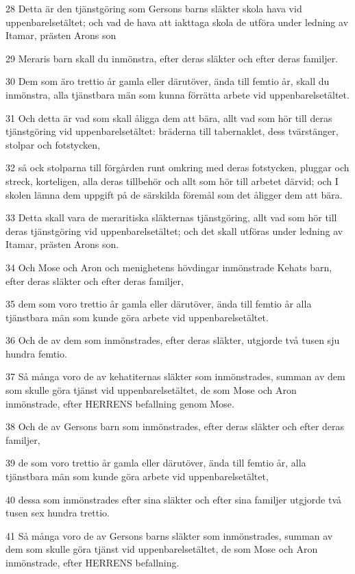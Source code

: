 \par 28 Detta är den tjänstgöring som Gersons barns släkter skola hava vid uppenbarelsetältet; och vad de hava att iakttaga skola de utföra under ledning av Itamar, prästen Arons son
\par 29 Meraris barn skall du inmönstra, efter deras släkter och efter deras familjer.
\par 30 Dem som äro trettio år gamla eller därutöver, ända till femtio år, skall du inmönstra, alla tjänstbara män som kunna förrätta arbete vid uppenbarelsetältet.
\par 31 Och detta är vad som skall åligga dem att bära, allt vad som hör till deras tjänstgöring vid uppenbarelsetältet: bräderna till tabernaklet, dess tvärstänger, stolpar och fotstycken,
\par 32 så ock stolparna till förgården runt omkring med deras fotstycken, pluggar och streck, korteligen, alla deras tillbehör och allt som hör till arbetet därvid; och I skolen lämna dem uppgift på de särskilda föremål som det åligger dem att bära.
\par 33 Detta skall vara de meraritiska släkternas tjänstgöring, allt vad som hör till deras tjänstgöring vid uppenbarelsetältet; och det skall utföras under ledning av Itamar, prästen Arons son.
\par 34 Och Mose och Aron och menighetens hövdingar inmönstrade Kehats barn, efter deras släkter och efter deras familjer,
\par 35 dem som voro trettio år gamla eller därutöver, ända till femtio år alla tjänstbara män som kunde göra arbete vid uppenbarelsetältet.
\par 36 Och de av dem som inmönstrades, efter deras släkter, utgjorde två tusen sju hundra femtio.
\par 37 Så många voro de av kehatiternas släkter som inmönstrades, summan av dem som skulle göra tjänst vid uppenbarelsetältet, de som Mose och Aron inmönstrade, efter HERRENS befallning genom Mose.
\par 38 Och de av Gersons barn som inmönstrades, efter deras släkter och efter deras familjer,
\par 39 de som voro trettio år gamla eller därutöver, ända till femtio år, alla tjänstbara män som kunde göra arbete vid uppenbarelsetältet,
\par 40 dessa som inmönstrades efter sina släkter och efter sina familjer utgjorde två tusen sex hundra trettio.
\par 41 Så många voro de av Gersons barns släkter som inmönstrades, summan av dem som skulle göra tjänst vid uppenbarelsetältet, de som Mose och Aron inmönstrade, efter HERRENS befallning.
